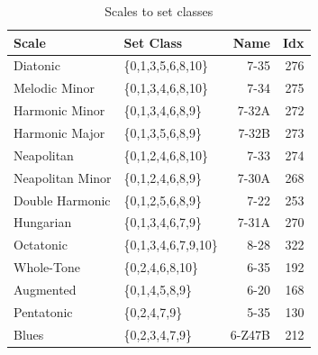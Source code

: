 \documentclass{article}
\begin{document}
\begin{table}[htb]
\caption{Scales to set classes} \label{tab:scales}
\begin{center}
\begin{tabular}{llrr}
\hline
 Scale             &  Set Class             &    Name  &  Idx  \\
\hline
 Diatonic          &  \{0,1,3,5,6,8,10\}    &    7-35  &  276  \\
 Melodic Minor     &  \{0,1,3,4,6,8,10\}    &    7-34  &  275  \\
 Harmonic Minor    &  \{0,1,3,4,6,8,9\}     &   7-32A  &  272  \\
 Harmonic Major    &  \{0,1,3,5,6,8,9\}     &   7-32B  &  273  \\
 Neapolitan        &  \{0,1,2,4,6,8,10\}    &    7-33  &  274  \\
 Neapolitan Minor  &  \{0,1,2,4,6,8,9\}     &   7-30A  &  268  \\
 Double Harmonic   &  \{0,1,2,5,6,8,9\}     &    7-22  &  253  \\
 Hungarian         &  \{0,1,3,4,6,7,9\}     &   7-31A  &  270  \\
 Octatonic         &  \{0,1,3,4,6,7,9,10\}  &    8-28  &  322  \\
 Whole-Tone        &  \{0,2,4,6,8,10\}      &    6-35  &  192  \\
 Augmented         &  \{0,1,4,5,8,9\}       &    6-20  &  168  \\
 Pentatonic        &  \{0,2,4,7,9\}         &    5-35  &  130  \\
 Blues             &  \{0,2,3,4,7,9\}       &  6-Z47B  &  212  \\
\hline
\end{tabular}
\end{center}
\end{table}
\end{document}
